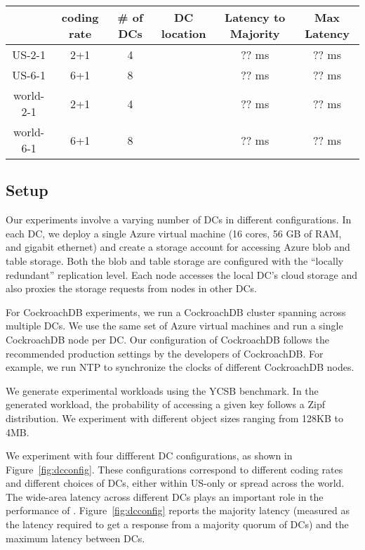 \begin{figure*}
\begin{tabular}{c|c|c|c|c|c}
& coding rate & \# of DCs & DC location & Latency to Majority & Max Latency\\
\hline
US-2-1 & 2+1 & 4 &  & ?? ms& ?? ms\\
US-6-1 & 6+1 & 8 & &?? ms&?? ms\\ 
world-2-1 & 2+1 & 4 &  &?? ms &?? ms\\
world-6-1 & 6+1 & 8 & &?? ms &?? ms\\
\end{tabular}
\caption{The DC configurations and inter-DC latencies in various experiments~\label{fig:dcconfig}} 
\end{figure*}

\subsection{Setup}
Our experiments involve a varying number of DCs in different configurations. In
each DC, we deploy a single Azure virtual machine (16 cores, 56 GB of RAM, and
gigabit ethernet) and create a storage account for accessing Azure blob and
table storage. Both the blob and table storage are configured with the
``locally redundant'' replication level.  Each \name node accesses the local
DC's cloud storage and also proxies the storage requests from \name nodes in
other DCs.  

For CockroachDB experiments, we run a CockroachDB cluster spanning across
multiple DCs.  We use the same set of Azure virtual machines and run a single
CockroachDB node per DC. Our configuration of CockroachDB follows the
recommended production settings by the developers of CockroachDB. For example,
we run NTP to synchronize the clocks of different CockroachDB nodes. 

We generate experimental workloads using the YCSB benchmark. In the generated
workload, the probability of accessing a given key follows a Zipf distribution.
We experiment with different object sizes ranging from 128KB to 4MB. 

We experiment with four diffferent DC configurations, as shown in
Figure~\ref{fig:dcconfig}.  These configurations correspond to different coding
rates and different choices of DCs, either within US-only or spread across the
world. The wide-area latency across different DCs plays an important role in 
the performance of \name.  Figure~\ref{fig:dcconfig} reports the majority
latency (measured as the latency required to get a response from a majority
quorum of DCs) and the maximum latency between DCs.

